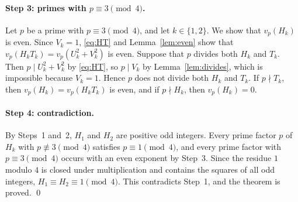 \documentclass[11pt]{article}
\begin{document}
\paragraph{Step 3: primes with $p\equiv3\pmod4$.} Let $p$ be a prime with $p\equiv3\pmod4$, and let $k\in\{1,2\}$. We show that $v_p(H_k)$ is even. Since $V_k=1$, \eqref{eq:HT} and Lemma~\ref{lem:even} show that $v_p(H_kT_k)=v_p(U_k^2+V_k^2)$ is even. Suppose that $p$ divides both $H_k$ and $T_k$. Then $p\mid U_k^2+V_k^2$ by \eqref{eq:HT}, so $p\mid V_k$ by Lemma~\ref{lem:divides}, which is impossible because $V_k=1$. Hence $p$ does not divide both $H_k$ and $T_k$. If $p\nmid T_k$, then $v_p(H_k)=v_p(H_kT_k)$ is even, and if $p\nmid H_k$, then $v_p(H_k)=0$.

\paragraph{Step 4: contradiction.} By Steps~1 and~2, $H_1$ and $H_2$ are positive odd integers. Every prime factor $p$ of $H_k$ with $p\not\equiv3\pmod4$ satisfies $p\equiv1\pmod4$, and every prime factor with $p\equiv3\pmod4$ occurs with an even exponent by Step~3. Since the residue $1$ modulo $4$ is closed under multiplication and contains the squares of all odd integers, $H_1\equiv H_2\equiv1\pmod4$. This contradicts Step~1, and the theorem is proved.
\qed
\end{document}
